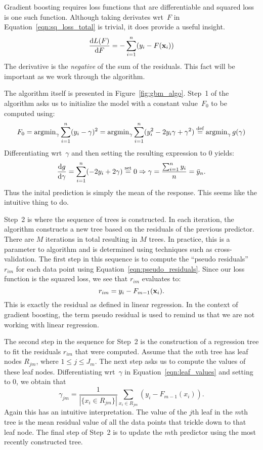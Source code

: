 Gradient boosting requires loss functions that are differentiable and squared loss
is one such function. Although taking derivates wrt~$F$ 
in Equation~\ref{eqn:sq_loss_total} is trivial, it does provide a useful insight.
\begin{equation}
    \frac{\mathrm{d} L(F)}{\mathrm{d} F} 
        = - \sum_{i = 1}^n (y_i - F(\mathbf{x}_i))   
\end{equation}
The derivative is the \emph{negative} of the sum of the residuals. This fact 
will be important as we work through the algorithm.

The algorithm itself is presented in Figure~\ref{fig:gbm_algo}. Step~1 of the 
algorithm asks us to initialize the model with a constant value~$F_0$ 
to be computed using:
\begin{equation}
        F_0 
        = \operatorname{argmin}_{\gamma} \sum_{i = 1}^{n} (y_i - \gamma)^2
        = \operatorname{argmin}_{\gamma} \sum_{i = 1}^{n} (y_i^2 - 2 y_i \gamma + \gamma^2)
        \stackrel{\text{def}}{=} \operatorname{argmin}_{\gamma} g(\gamma)
\end{equation}
Differentiating wrt~$\gamma$ and then setting the resulting expression to $0$
yields:
\[
    \frac{\mathrm{d} g}{\mathrm{d} \gamma} = \sum_{i = 1}^{n} (-2 y_i + 2 \gamma) \stackrel{\text{set}}{=} 0
    \Rightarrow \gamma = \frac{\sum_{i = 1}^{n} y_i}{n} = \bar{y}_n.
\]
Thus the inital prediction is simply the mean of the response. This seems 
like the intuitive thing to do. 

Step~2 is where the sequence of trees is constructed. In each iteration, 
the algorithm constructs a new tree based on the residuals of the previous 
predictor. There are $M$ iterations in total resulting in $M$ trees. 
In practice, this is a parameter to algorithm and is determined using techniques 
such as cross-validation. The first step in this sequence is to compute the 
``pseudo residuals'' $r_{i m}$ for each data point using 
Equation~\ref{eqn:pseudo_residuals}. Since our loss function 
is the squared loss, we see that $r_{im}$ evaluates to: 
\[
    r_{i m} = y_i - F_{m - 1}(\mathbf{x}_i).
\] 
This is exactly the residual as defined in linear regression. In the context 
of gradient boosting, the term pseudo residual is used to remind us that we 
are not working with linear regression.

The second step in the sequence for Step~2 is the construction of a regression 
tree to fit the residuals $r_{i m}$ that were computed. Assume that the $m$th 
tree has leaf nodes $R_{j m}$, where $1 \leq j \leq J_m$. The next step asks 
us to compute the values of these leaf nodes. Differentiating wrt~$\gamma$ 
in Equation~\ref{eqn:leaf_values} and setting to $0$, we obtain that
\begin{equation}
    \gamma_{j m} 
        = \frac{1}{| \{ x_i \in R_{j m} \} |} \sum_{x_i \in R_{j m}} (y_i - F_{m - 1}(x_i)).
\end{equation}
Again this has an intuitive interpretation. The value of the $j$th leaf in the 
$m$th tree is the mean residual value of all the data points that trickle down
to that leaf node. The final step of Step~2 is to update the $m$th predictor 
using the most recently constructed tree.  

